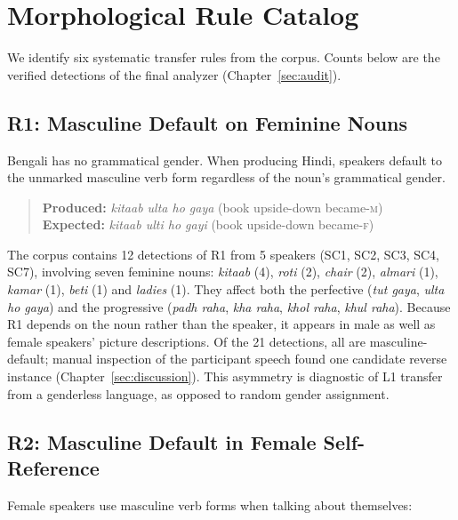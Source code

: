 \documentclass[11pt,a4paper]{report}
\begin{document}
\chapter{Morphological Rule Catalog}
\label{sec:rules}

We identify six systematic transfer rules from the corpus. Counts below are the verified detections of the final analyzer (Chapter~\ref{sec:audit}).

\section{R1: Masculine Default on Feminine Nouns}

Bengali has no grammatical gender. When producing Hindi, speakers default to the unmarked masculine verb form regardless of the noun's grammatical gender.

\begin{quote}
  \textbf{Produced:} \textit{kitaab ulta ho gaya} (book upside-down became-\textsc{m})\\
  \textbf{Expected:} \textit{kitaab ulti ho gayi} (book upside-down became-\textsc{f})
\end{quote}

The corpus contains 12 detections of R1 from 5 speakers (SC1, SC2, SC3, SC4, SC7), involving seven feminine nouns: \textit{kitaab} (4), \textit{roti} (2), \textit{chair} (2), \textit{almari} (1), \textit{kamar} (1), \textit{beti} (1) and \textit{ladies} (1). They affect both the perfective (\textit{tut gaya}, \textit{ulta ho gaya}) and the progressive (\textit{padh raha}, \textit{kha raha}, \textit{khol raha}, \textit{khul raha}). Because R1 depends on the noun rather than the speaker, it appears in male as well as female speakers' picture descriptions. Of the 21 detections, all are masculine-default; manual inspection of the participant speech found one candidate reverse instance (Chapter~\ref{sec:discussion}). This asymmetry is diagnostic of L1 transfer from a genderless language, as opposed to random gender assignment.

\section{R2: Masculine Default in Female Self-Reference}

Female speakers use masculine verb forms when talking about themselves:
\end{document}
